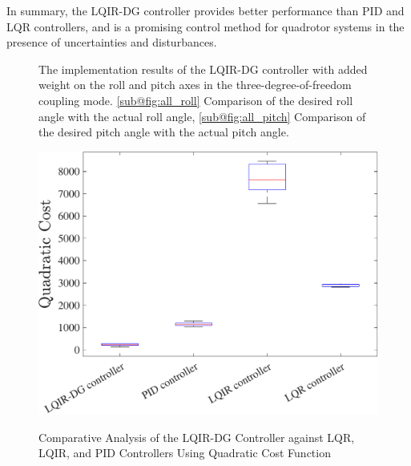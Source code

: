 \documentclass[3p,times]{elsarticle}
\begin{document}
In summary, the LQIR-DG controller provides better performance than PID and LQR controllers, and is a promising control method for quadrotor systems in the presence of uncertainties and disturbances.

\begin{figure}[H]
	\centering
	\caption{The implementation results of the LQIR-DG controller with added weight on the roll and pitch axes in the three-degree-of-freedom coupling mode. \ref{sub@fig:all_roll} Comparison of the desired roll angle with the actual roll angle, \ref{sub@fig:all_pitch} Comparison of the desired pitch angle with the actual pitch angle.}
	\label{fig:compare}
\end{figure}

\begin{figure}[H]
	\centering
	{\includegraphics[width=.49\linewidth]{../Figure/implementation/box_plot/lqidgvsboxplot}
	}
	\caption{Comparative Analysis of the LQIR-DG Controller against LQR, LQIR, and PID Controllers Using Quadratic Cost Function}
	\label{fig:compare_boxplot}
\end{figure}
\end{document}
